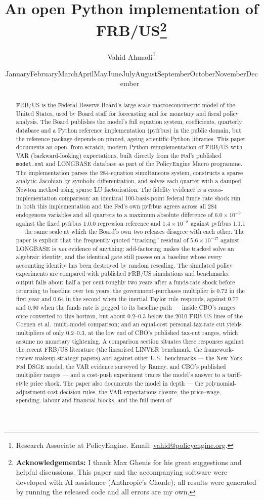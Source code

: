 \documentclass[11pt]{article}
\title{\bfseries An open Python implementation of FRB/US\thanks{\textbf{Acknowledgements:} I thank Max Ghenis for his great suggestions and helpful discussions. This paper and the accompanying software were developed with AI assistance (Anthropic's Claude); all results were generated by running the released code and all errors are my own.}\\[0.7cm]}
\author{Vahid Ahmadi\thanks{Research Associate at PolicyEngine. Email: \href{mailto:vahid@policyengine.org}{vahid@policyengine.org}.}}
\date{\small \ifcase\month\or January\or February\or March\or April\or May\or June\or July\or August\or September\or October\or November\or December\fi\ \the\year}
\begin{document}
\maketitle

\begin{abstract}
\noindent FRB/US is the Federal Reserve Board's large-scale macroeconometric model of the United States, used by Board staff for forecasting and for monetary and fiscal policy analysis. The Board publishes the model's full equation system, coefficients, quarterly database and a Python reference implementation (pyfrbus) in the public domain, but the reference package depends on pinned, ageing scientific-Python libraries. This paper documents an open, from-scratch, modern Python reimplementation of FRB/US with VAR (backward-looking) expectations, built directly from the Fed's published \texttt{model.xml} and LONGBASE database as part of the PolicyEngine Macro programme. The implementation parses the 284-equation simultaneous system, constructs a sparse analytic Jacobian by symbolic differentiation, and solves each quarter with a damped Newton method using sparse LU factorisation. The fidelity evidence is a cross-implementation comparison: an identical 100-basis-point federal funds rate shock run in both this implementation and the Fed's own pyfrbus agrees across all 284 endogenous variables and all quarters to a maximum absolute difference of $6.0\times10^{-9}$ against the fixed pyfrbus 1.0.0 regression reference and $1.4\times10^{-8}$ against pyfrbus 1.1.1 --- the same scale at which the Board's own two releases disagree with each other. The paper is explicit that the frequently quoted ``tracking'' residual of $5.6\times10^{-17}$ against LONGBASE is \emph{not} evidence of anything: add-factoring makes the tracked solve an algebraic identity, and the identical gate still passes on a baseline whose every accounting identity has been destroyed by random rescaling. The simulated policy experiments are compared with published FRB/US simulations and benchmarks: output falls about half a per cent roughly two years after a funds-rate shock before returning to baseline over ten years; the government-purchases multiplier is 0.72 in the first year and 0.64 in the second when the inertial Taylor rule responds, against 0.77 and 0.90 when the funds rate is pegged to its baseline path --- inside CBO's ranges once converted to this horizon, but about 0.2--0.3 below the 2010 FRB-US lines of the Coenen et al.\ multi-model comparison; and an equal-cost personal-tax-rate cut yields multipliers of only 0.2--0.3, at the low end of CBO's published tax-cut ranges, which assume no monetary tightening. A comparison section situates these responses against the recent FRB/US literature (the linearised LINVER benchmark, the framework-review makeup-strategy papers) and against other U.S.\ benchmarks --- the New York Fed DSGE model, the VAR evidence surveyed by Ramey, and CBO's published multiplier ranges --- and a cost-push experiment traces the model's answer to a tariff-style price shock. The paper also documents the model in depth --- the polynomial-adjustment-cost decision rules, the VAR-expectations closure, the price--wage, spending, labour and financial blocks, and the full menu of 
\end{abstract}
\end{document}
